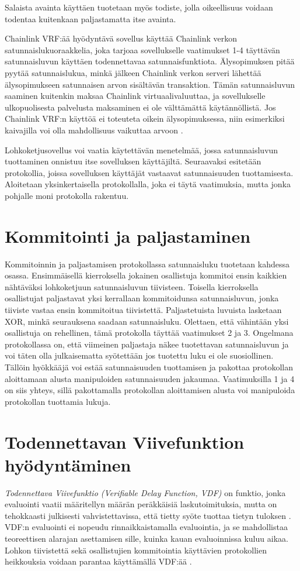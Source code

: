 Salaista avainta käyttäen tuotetaan myös todiste, jolla oikeellisuus voidaan todentaa kuitenkaan paljastamatta itse avainta.

Chainlink VRF:ää hyödyntävä sovellus käyttää Chainlink verkon satunnaislukuoraakkelia, joka tarjoaa sovellukselle vaatimukset 1-4 täyttävän satunnaisluvun käyttäen todennettavaa satunnaisfunktiota. Älysopimuksen pitää pyytää satunnaislukua, minkä jälkeen Chainlink verkon serveri lähettää älysopimukseen satunnaisen arvon sisältävän transaktion. Tämän satunnaisluvun saaminen kuitenkin maksaa Chainlink virtuaalivaluuttaa, ja sovellukselle ulkopuolisesta palvelusta maksaminen ei ole välttämättä käytännöllistä. Jos Chainlink VRF:n käyttöä ei toteuteta oikein älysopimuksessa, niin esimerkiksi kaivajilla voi olla mahdollisuus vaikuttaa arvoon \cite{noauthor_chainlink_nodate}.

Lohkoketjusovellus voi vaatia käytettävän menetelmää, jossa satunnaisluvun tuottaminen onnistuu itse sovelluksen käyttäjiltä. Seuraavaksi esitetään protokollia, joissa sovelluksen käyttäjät vastaavat satunnaisuuden tuottamisesta. Aloitetaan yksinkertaisella protokollalla, joka ei täytä vaatimuksia, mutta jonka pohjalle moni protokolla rakentuu.

\section{Kommitointi ja paljastaminen} %
Kommitoinnin ja paljastamisen protokollassa satunnaisluku tuotetaan kahdessa osassa. Ensimmäisellä kierroksella jokainen osallistuja kommitoi ensin kaikkien nähtäväksi lohkoketjuun satunnaisluvun tiivisteen. Toisella kierroksella osallistujat paljastavat yksi kerrallaan kommitoidunsa satunnaisluvun, jonka tiiviste vastaa ensin kommitoitua tiivistettä. Paljastetuista luvuista lasketaan XOR, minkä seurauksena saadaan satunnaisluku. Olettaen, että vähintään yksi osallistuja on rehellinen, tämä protokolla täyttää vaatimukset 2 ja 3. Ongelmana protokollassa on, että viimeinen paljastaja näkee tuotettavan satunnaisluvun ja voi täten olla julkaisematta syötettään jos tuotettu luku ei ole suosiollinen. Tällöin hyökkääjä voi estää satunnaisuuden tuottamisen ja pakottaa protokollan aloittamaan alusta manipuloiden satunnaisuuden jakaumaa. Vaatimuksilla 1 ja 4 on siis yhteys, sillä pakottamalla protokollan aloittamisen alusta voi manipuloida protokollan tuottamia lukuja.

\section{Todennettavan Viivefunktion hyödyntäminen}
\textit{Todennettava Viivefunktio  (Verifiable Delay Function, VDF)} on funktio, jonka evaluointi vaatii määritellyn määrän peräkkäisiä laskutoimituksia, mutta on tehokkaasti julkisesti vahvistettavissa, että tietty syöte tuottaa tietyn tuloksen \cite{boneh_verifiable_2018}. VDF:n evaluointi ei nopeudu rinnaikkaistamalla evaluointia, ja se mahdollistaa teoreettisen alarajan asettamisen sille, kuinka kauan evaluoinnissa kuluu aikaa. Lohkon tiivistettä sekä osallistujien kommitointia käyttävien protokollien heikkouksia voidaan parantaa käyttämällä VDF:ää \cite{boneh_verifiable_2018}. 

